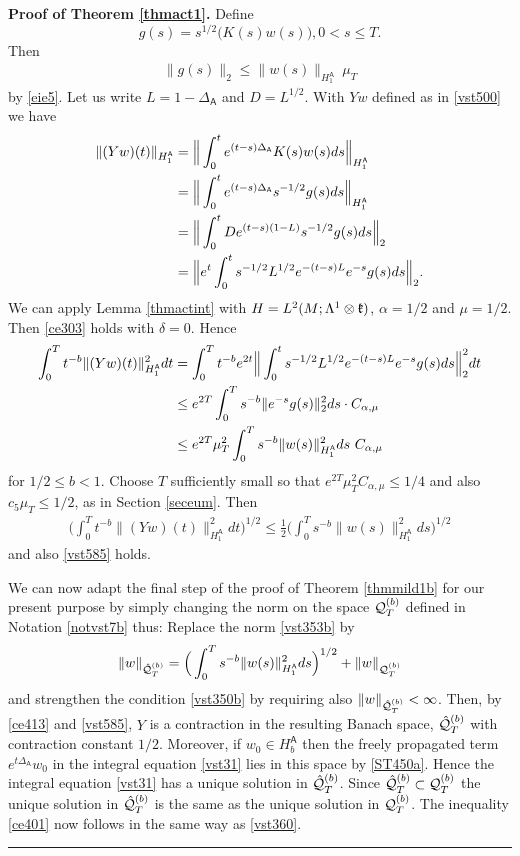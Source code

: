 \documentclass[12pt]{article}
\newenvironment{proof}[1][Proof]{\textbf{#1.} }{\ \rule{0.5em}{0.5em}}
\def \L{\Lambda}
\def \As{\mathsf{A}}
\def \Q{{\cal Q}}
\def \kf{\frak k}
\def \beq{\begin{equation}}
\def \eeq{\end{equation}}
\def \eref{\eqref}
\numberwithin{equation}{section}
\begin{document}
\bigskip
\noindent 
\begin{proof}[Proof of Theorem \ref{thmact1}]
Define
\beq
g(s) = s^{1/2}  \Big( K(s)w(s)\Big),  0 < s \le T.
\eeq
Then
\begin{align}
\|g(s)\|_2 \le \|w(s)\|_{H_1^\As}\ \mu_T
\end{align}
by \eref{eie5}.
 Let us write $L = 1-\Delta_\As$ and $D = L^{1/2}$.
With $Yw$ defined as in \eref{vst500} we have 
\begin{align}
\|(Yw)(t)\|_{H_1^\As} &= \Big\|\int_0^t e^{(t-s)\Delta_\As} K(s)w(s) ds\Big\|_{H_1^\As}          \notag \\
&= \Big\|\int_0^t e^{(t-s)\Delta_\As} s^{-1/2} g(s)ds\Big\|_{H_1^\As}                \notag\\
&=\Big\|\int_0^t D e^{(t-s)(1-L)} s^{-1/2} g(s)ds \Big\|_2                   \notag\\
&= \Big\|e^t \int_0^t s^{-1/2}L^{1/2} e^{-(t-s)L} e^{-s}g(s)ds \Big\|_2. 
\end{align}   
We can apply 
Lemma \ref{thmactint} 
 with $H = L^2(M; \L^1\otimes \kf)$, $\alpha = 1/2$ and $\mu = 1/2$. 
 Then  \eref{ce303} holds with $\delta = 0$. Hence
\begin{align}
\int_0^T t^{-b} \|(Yw)(t)\|_{H_1^\As}^2 dt 
&=\int_0^T t^{-b} e^{2t} \Big\|\int_0^t s^{-1/2}L^{1/2} e^{-(t-s)L} e^{-s}g(s)ds \Big\|_2^2 dt  \notag\\
 &\le  e^{2T}\int_0^T s^{-b} \|e^{-s} g(s)\|_2^2 ds\cdot C_{\alpha, \mu}     \notag\\
 &\le e^{2T}\mu_T^2   \int_0^T s^{-b} \|w(s)\|_{H_1^\As}^2 ds\  C_{\alpha, \mu}      \label{ce412}
\end{align}
for $ 1/2  \le b < 1$.  
 Choose $T$ sufficiently
small so that  $e^{2T}\mu_T^2 C_{\alpha,\mu} \le 1/4$ and 
also $c_5 \mu_T \le 1/2$, as in Section \ref{seceum}. Then
\begin{align}
\Big(\int_0^T t^{-b} \| (Yw)(t)\|_{H_1^\As}^2 dt\Big)^{1/2}
\le \frac{1}{2} \Big(\int_0^T s^{-b} \|w(s)\|_{H_1^\As}^2 ds\Big)^{1/2}   \label{ce413}
\end{align}
and also \eref{vst585} holds.

We can now adapt the final step of the proof of Theorem \ref{thmmild1b} for
 our present purpose by simply
changing the norm on the space $\Q_T^{(b)}$ defined in  Notation \ref{notvst7b} thus: 
Replace the norm \eref{vst353b} by 
\beq
\|w\|_{\hat\Q_T^{(b)}} =  \Big(\int_0^T s^{-b} \|w(s)\|_{H_1^\As}^2 ds\Big)^{1/2} + \|w\|_{\Q_T^{(b)}}
\eeq
and strengthen  the condition \eref{vst350b} by requiring also $\|w\|_{\hat\Q_T^{(b)}}<\infty$.
 Then, by \eref{ce413} and \eref{vst585},  $Y$ is a contraction
in the resulting Banach space, $\hat\Q_T^{(b)}$ with contraction constant $1/2$.  
 Moreover, if $w_0 \in H_b^\As$ then
 the freely propagated term $e^{t\Delta_\As} w_0$ in the integral equation \eref{vst31}
  lies in this space by  \eref{ST450a}. Hence the integral equation \eref{vst31} has a unique
  solution in $\hat \Q_T^{(b)}$.  Since $\hat\Q_T^{(b)} \subset \Q_T^{(b)}$ the unique solution
  in  $\hat \Q_T^{(b)}$ is the same as the unique solution in  $ \Q_T^{(b)}$. The inequality
  \eref{ce401} now follows in the same way as \eref{vst360}.
   \end{proof}
\end{document}
